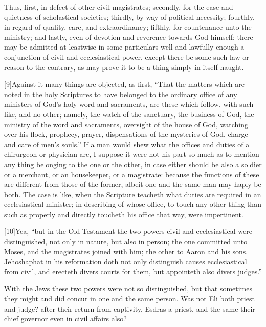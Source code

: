 Thus, first, in defect of other civil magistrates; secondly, for the ease and quietness of scholastical societies; thirdly, by way of political necessity; fourthly, in regard of quality, care, and extraordinancy; fifthly, for countenance unto the ministry; and lastly, even of devotion and reverence towards God himself: there may be admitted at leastwise in some particulars well and lawfully enough a conjunction of civil and ecclesiastical power, except there be some such law or reason to the contrary, as may prove it to be a thing simply in itself naught.

[9]Against it many things are objected, as first, “That the matters which are noted in the holy Scriptures to have belonged to the ordinary office of any ministers of God’s holy word and sacraments, are these which follow, with such like, and no other; namely, the watch of the sanctuary, the business of God, the ministry of the word and sacraments, oversight of the house of God, watching over his flock, prophecy, prayer, dispensations of the mysteries of  God, charge and care of men’s souls.” If a man would shew what the offices and duties of a chirurgeon or physician are, I suppose it were not his part so much as to mention any thing belonging to the one or the other, in case either should be also a soldier or a merchant, or an housekeeper, or a magistrate: because the functions of these are different from those of the former, albeit one and the same man may haply be both. The case is like, when the Scripture teacheth what duties are required in an ecclesiastical minister; in describing of whose office, to touch any other thing than such as properly and directly toucheth his office that way, were impertinent.

[10]Yea, “but in the Old Testament the two powers civil and ecclesiastical were distinguished, not only in nature, but also in person; the one committed unto Moses, and the magistrates joined with him; the other to Aaron and his sons. Jehoshaphat in his reformation doth not only distinguish causes ecclesiastical from civil, and  erecteth divers courts for them, but appointeth also divers judges.”

With the Jews these two powers were not so distinguished, but that sometimes they might and did concur in one and the same person. Was not Eli both priest and judge? after their return from captivity, Esdras a priest, and the same their chief governor even in civil affairs also?

